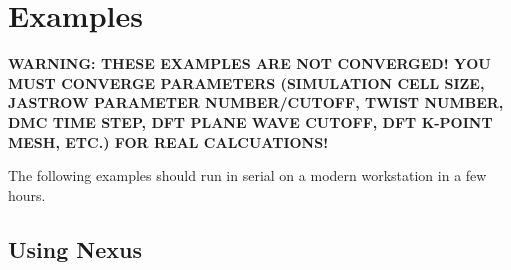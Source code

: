 \chapter{Examples}
\label{chap:examples}

\textbf{WARNING: THESE EXAMPLES ARE NOT CONVERGED! YOU MUST CONVERGE PARAMETERS (SIMULATION CELL SIZE, JASTROW PARAMETER NUMBER/CUTOFF, TWIST NUMBER, DMC TIME STEP, DFT PLANE WAVE CUTOFF, DFT K-POINT MESH, ETC.) FOR REAL CALCUATIONS!}

The following examples should run in serial on a modern workstation in a few hours.

\section{Using Nexus}

